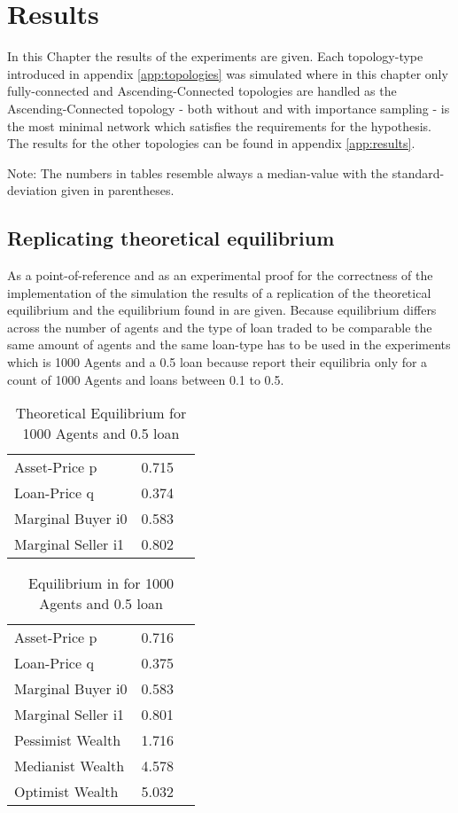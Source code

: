 \documentclass[Bachelorarbeit.tex]{subfiles}
\begin{document}
\graphicspath{{./figures/results/}}	%

\chapter{Results}
\label{ch:results}

In this Chapter the results of the experiments are given. Each topology-type introduced in appendix \ref{app:topologies} was simulated where in this chapter only fully-connected and Ascending-Connected topologies are handled as the Ascending-Connected topology - both without and with importance sampling - is the most minimal network which satisfies the requirements for the hypothesis. 
The results for the other topologies can be found in appendix \ref{app:results}.

Note: The numbers in tables resemble always a median-value with the standard-deviation given in parentheses.

\section{Replicating theoretical equilibrium}
As  a point-of-reference and as an experimental proof for the correctness of the implementation of the simulation the results of a replication of the theoretical equilibrium and the equilibrium found in \cite{Breuer2015} are given.
Because equilibrium differs across the number of agents and the type of loan traded to be comparable the same amount of agents and the same loan-type has to be used in the experiments which is 1000 Agents and a 0.5 loan because \cite{Breuer2015} report their equilibria only for a count of 1000 Agents and loans between 0.1 to 0.5.

\begin{table}[h]
	\centering
	\caption{Theoretical Equilibrium for 1000 Agents and 0.5 loan}
	\begin{tabular} { l c r }
		\hline
		Asset-Price p & 0.715 \\
		Loan-Price q & 0.374 \\
		Marginal Buyer i0 & 0.583 \\
		Marginal Seller i1 & 0.802 \\
		\hline
	\end{tabular}
\end{table}


\begin{table}[h]
	\centering
	\caption{Equilibrium in \cite{Breuer2015} for 1000 Agents and 0.5 loan }
	\begin{tabular} { l c r }
		\hline
		Asset-Price p & 0.716 \\
		Loan-Price q & 0.375 \\
		Marginal Buyer i0 & 0.583 \\
		Marginal Seller i1 & 0.801 \\
		\hline
		Pessimist Wealth & 1.716 \\
		Medianist Wealth & 4.578 \\
		Optimist Wealth & 5.032 \\
		\hline
	\end{tabular}
\end{table}
\end{document}
